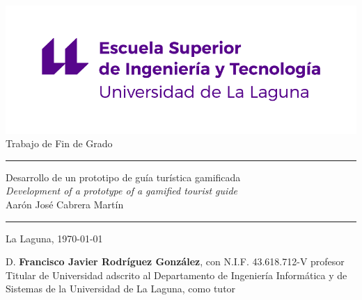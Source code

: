\documentclass[spanish,a4paper,12pt,oneside]{extreport}
\begin{document}
\renewcommand\listtablename{Índice de Tablas}    
\renewcommand\listfigurename{Índice de Figuras}    

\pagestyle{empty}
\thispagestyle{empty}


\newcommand{\HRule}{\rule{\linewidth}{1mm}}
\setlength{\parindent}{0mm}
\setlength{\parskip}{0mm}


\begin{center}
\includegraphics[scale=0.8]{images/escuela-ingenieria-tecnologia-original}\\[10mm]
{\Huge Trabajo de Fin de Grado}
\end{center}

\HRule
\begin{flushright}
        {\Huge Desarrollo de un prototipo de guía turística gamificada} \\[2.5mm]
        {\Large \textit{Development of a prototype of a gamified tourist guide}} \\[5mm]
        {\Large Aarón José Cabrera Martín} \\[5mm]


\end{flushright}
\HRule
{}
\begin{center}
  \Large La Laguna, \today
\end{center}

\setlength{\parindent}{5mm}

\newpage
\thispagestyle{empty}

D. {\bf Francisco Javier Rodríguez González}, con N.I.F. 43.618.712-V profesor Titular de Universidad adscrito al Departamento de Ingeniería Informática y de Sistemas de la Universidad de La Laguna, como tutor
\end{document}
